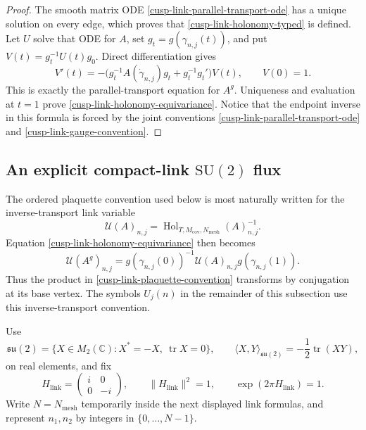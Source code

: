 \documentclass[11pt]{article}
\theoremstyle{definition}
\numberwithin{equation}{section}
\begin{document}
\begin{proof}
The smooth matrix ODE \eqref{cusp-link-parallel-transport-ode} has a unique
solution on every edge, which proves that \eqref{cusp-link-holonomy-typed}
is defined.  Let \(U\) solve that ODE for \(A\), set
\(g_t=g(\gamma_{n,j}(t))\), and put
\(V(t)=g_t^{-1}U(t)g_0\).  Direct differentiation gives
\[
 V'(t)=-\bigl(g_t^{-1}A(\dot\gamma_{n,j})g_t
                 +g_t^{-1}g_t'\bigr)V(t),
 \qquad V(0)=1.
\]
This is exactly the parallel-transport equation for \(A^g\).  Uniqueness
and evaluation at \(t=1\) prove \eqref{cusp-link-holonomy-equivariance}.
Notice that the endpoint inverse in this formula is forced by the joint
conventions \eqref{cusp-link-parallel-transport-ode} and
\eqref{cusp-link-gauge-convention}.
\end{proof}

\subsection{An explicit compact-link \texorpdfstring{\(\mathrm{SU}(2)\)}{SU(2)} flux}

The ordered plaquette convention used below is most naturally written for
the inverse-transport link variable
\begin{equation}
 \mathcal U(A)_{n,j}
 =\operatorname{Hol}_{T,M_{\mathrm{cov}},N_{\mathrm{mesh}}}(A)_{n,j}^{-1}.
 \label{cusp-link-inverse-transport-variable}
\end{equation}
Equation \eqref{cusp-link-holonomy-equivariance} then becomes
\begin{equation}
 \mathcal U(A^g)_{n,j}
 =g(\gamma_{n,j}(0))^{-1}\mathcal U(A)_{n,j}g(\gamma_{n,j}(1)).
 \label{cusp-link-inverse-transport-gauge-law}
\end{equation}
Thus the product in \eqref{cusp-link-plaquette-convention} transforms by
conjugation at its base vertex.  The symbols \(U_j(n)\) in the remainder of
this subsection use this inverse-transport convention.

Use
\begin{equation}
 \mathfrak{su}(2)=\{X\in M_2(\mathbb C):X^*=-X,\ \operatorname{tr}X=0\},
 \qquad
 \langle X,Y\rangle_{\mathfrak{su}(2)}
 =-\frac12\operatorname{tr}(XY),
 \label{cusp-link-su2-inner-product}
\end{equation}
on real elements, and fix
\begin{equation}
 H_{\mathrm{link}}=\begin{pmatrix}i&0\\0&-i\end{pmatrix},
 \qquad
 \lVert H_{\mathrm{link}}\rVert^2=1,
 \qquad \exp(2\pi H_{\mathrm{link}})=1.
 \label{cusp-link-flux-generator}
\end{equation}
Write \(N=N_{\mathrm{mesh}}\) temporarily inside the next displayed link
formulas, and represent \(n_1,n_2\) by integers in
\(\{0,\ldots,N-1\}\).
\end{document}
